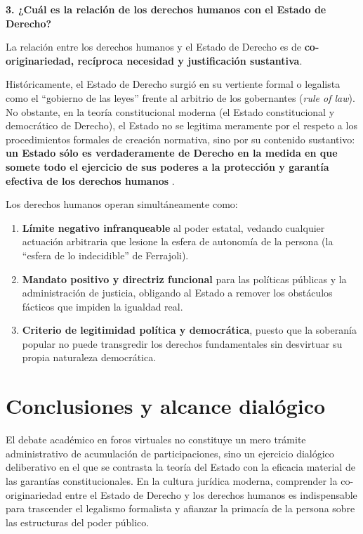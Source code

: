 \documentclass[spanish,letterpaper,oneside]{article}
\begin{document}
\begin{forobox}[title={Participación para el Foro de Derechos Humanos -- Texto para publicación}]
\medskip
\textbf{3. ¿Cuál es la relación de los derechos humanos con el Estado de Derecho?}

La relación entre los derechos humanos y el Estado de Derecho es de \textbf{co-originariedad, recíproca necesidad y justificación sustantiva}. 

Históricamente, el Estado de Derecho surgió en su vertiente formal o legalista como el ``gobierno de las leyes'' frente al arbitrio de los gobernantes (\emph{rule of law}). No obstante, en la teoría constitucional moderna (el Estado constitucional y democrático de Derecho), el Estado no se legitima meramente por el respeto a los procedimientos formales de creación normativa, sino por su contenido sustantivo: \textbf{un Estado sólo es verdaderamente de Derecho en la medida en que somete todo el ejercicio de sus poderes a la protección y garantía efectiva de los derechos humanos} \citep{carbonell2019}.

Los derechos humanos operan simultáneamente como:
\begin{enumerate}[leftmargin=*,topsep=2pt,itemsep=1pt]
\item \textbf{Límite negativo infranqueable} al poder estatal, vedando cualquier actuación arbitraria que lesione la esfera de autonomía de la persona (la ``esfera de lo indecidible'' de Ferrajoli).
\item \textbf{Mandato positivo y directriz funcional} para las políticas públicas y la administración de justicia, obligando al Estado a remover los obstáculos fácticos que impiden la igualdad real.
\item \textbf{Criterio de legitimidad política y democrática}, puesto que la soberanía popular no puede transgredir los derechos fundamentales sin desvirtuar su propia naturaleza democrática.
\end{enumerate}
\end{forobox}

\section{Conclusiones y alcance dialógico}
El debate académico en foros virtuales no constituye un mero trámite administrativo de acumulación de participaciones, sino un ejercicio dialógico deliberativo en el que se contrasta la teoría del Estado con la eficacia material de las garantías constitucionales. En la cultura jurídica moderna, comprender la co-originariedad entre el Estado de Derecho y los derechos humanos es indispensable para trascender el legalismo formalista y afianzar la primacía de la persona sobre las estructuras del poder público.
\end{document}
